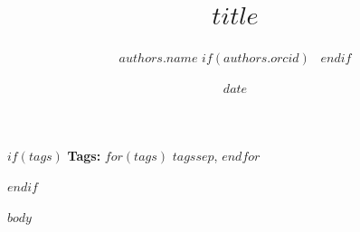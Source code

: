 \documentclass[11pt]{article}
\title{$title$}
\author[$authors.affiliation$]{%
  $authors.name$
  $if(authors.orcid)$%
    \,\orcidlink{$authors.orcid$}%
  $endif$%
}
\affil[$affiliations.index$]{$affiliations.name$}
\date{$date$}
\date{}
\begin{document}
\maketitle

$if(tags)$
\noindent\textbf{Tags: }
$for(tags)$
$tags$$sep$, \allowbreak
$endfor$
\par\vspace{1em}
$endif$


$body$
\end{document}
